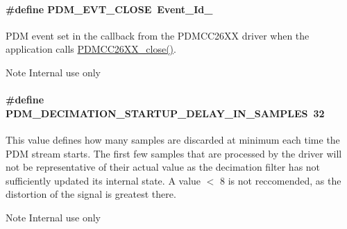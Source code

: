 \paragraph[{P\+D\+M\+\_\+\+E\+V\+T\+\_\+\+C\+L\+O\+S\+E}]{\setlength{\rightskip}{0pt plus 5cm}\#define P\+D\+M\+\_\+\+E\+V\+T\+\_\+\+C\+L\+O\+S\+E~Event\+\_\+\+Id\+\_}\label{_p_d_m_c_c26_x_x_8h_a93f987ca1724197322ca6c51e3224139}
P\+D\+M event set in the callback from the P\+D\+M\+C\+C26\+X\+X driver when the application calls \hyperlink{_p_d_m_c_c26_x_x_8h_afb9597d25d6b2e02f6903bf6652d4371}{P\+D\+M\+C\+C26\+X\+X\+\_\+close()}. \begin{DoxyNote}{Note}
Internal use only 
\end{DoxyNote}
\paragraph[{P\+D\+M\+\_\+\+D\+E\+C\+I\+M\+A\+T\+I\+O\+N\+\_\+\+S\+T\+A\+R\+T\+U\+P\+\_\+\+D\+E\+L\+A\+Y\+\_\+\+I\+N\+\_\+\+S\+A\+M\+P\+L\+E\+S}]{\setlength{\rightskip}{0pt plus 5cm}\#define P\+D\+M\+\_\+\+D\+E\+C\+I\+M\+A\+T\+I\+O\+N\+\_\+\+S\+T\+A\+R\+T\+U\+P\+\_\+\+D\+E\+L\+A\+Y\+\_\+\+I\+N\+\_\+\+S\+A\+M\+P\+L\+E\+S~32}\label{_p_d_m_c_c26_x_x_8h_ae4d19965c15ec934730399d8213f6bcb}
This value defines how many samples are discarded at minimum each time the P\+D\+M stream starts. The first few samples that are processed by the driver will not be representative of their actual value as the decimation filter has not sufficiently updated its internal state. A value $<$ 8 is not reccomended, as the distortion of the signal is greatest there. \begin{DoxyNote}{Note}
Internal use only 
\end{DoxyNote}
